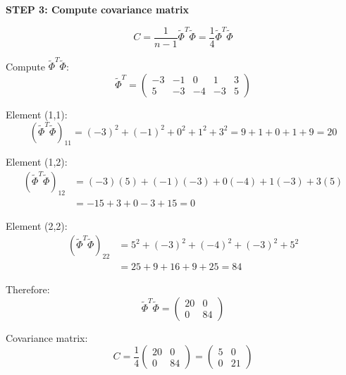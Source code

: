 \documentclass[12pt]{article}
\begin{document}
\begin{solution}
\textbf{STEP 3: Compute covariance matrix}

\[
C = \frac{1}{n-1} \tilde{\Phi}^T \tilde{\Phi} = \frac{1}{4} \tilde{\Phi}^T \tilde{\Phi}
\]

Compute $\tilde{\Phi}^T \tilde{\Phi}$:
\[
\tilde{\Phi}^T = \begin{pmatrix}
-3 & -1 & 0 & 1 & 3 \\
5 & -3 & -4 & -3 & 5
\end{pmatrix}
\]

Element (1,1):
\[
(\tilde{\Phi}^T \tilde{\Phi})_{11} = (-3)^2 + (-1)^2 + 0^2 + 1^2 + 3^2 = 9 + 1 + 0 + 1 + 9 = 20
\]

Element (1,2):
\begin{align*}
(\tilde{\Phi}^T \tilde{\Phi})_{12} &= (-3)(5) + (-1)(-3) + 0(-4) + 1(-3) + 3(5) \\
&= -15 + 3 + 0 - 3 + 15 = 0
\end{align*}

Element (2,2):
\begin{align*}
(\tilde{\Phi}^T \tilde{\Phi})_{22} &= 5^2 + (-3)^2 + (-4)^2 + (-3)^2 + 5^2 \\
&= 25 + 9 + 16 + 9 + 25 = 84
\end{align*}

Therefore:
\[
\tilde{\Phi}^T \tilde{\Phi} = \begin{pmatrix}
20 & 0 \\
0 & 84
\end{pmatrix}
\]

Covariance matrix:
\[
C = \frac{1}{4} \begin{pmatrix}
20 & 0 \\
0 & 84
\end{pmatrix} = \begin{pmatrix}
5 & 0 \\
0 & 21
\end{pmatrix}
\]


\end{solution}
\end{document}
